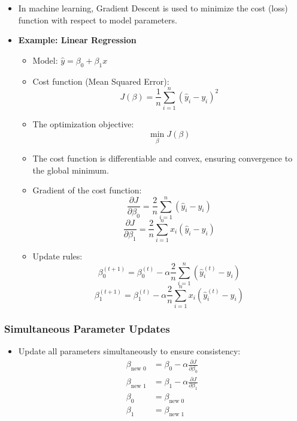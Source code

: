 \documentclass{article}
\begin{document}
\begin{itemize}
    \item In machine learning, Gradient Descent is used to minimize the cost (loss) function with respect to model parameters.
    \item \textbf{Example: Linear Regression}
    \begin{itemize}
        \item Model: $\hat{y} = \beta_0 + \beta_1 x$
        \item Cost function (Mean Squared Error):
        \[
        J(\beta) = \frac{1}{n} \sum_{i=1}^{n} (\hat{y}_i - y_i)^2
        \]
        \item The optimization objective:
        \[
        \min_{\beta} J(\beta)
        \]
        \item The cost function is differentiable and convex, ensuring convergence to the global minimum.
        \item Gradient of the cost function:
        \[
        \frac{\partial J}{\partial \beta_0} = \frac{2}{n} \sum_{i=1}^{n} (\hat{y}_i - y_i)
        \]
        \[
        \frac{\partial J}{\partial \beta_1} = \frac{2}{n} \sum_{i=1}^{n} x_i (\hat{y}_i - y_i)
        \]
        \item Update rules:
        \[
        \beta_0^{(t+1)} = \beta_0^{(t)} - \alpha \frac{2}{n} \sum_{i=1}^{n} (\hat{y}_i^{(t)} - y_i)
        \]
        \[
        \beta_1^{(t+1)} = \beta_1^{(t)} - \alpha \frac{2}{n} \sum_{i=1}^{n} x_i (\hat{y}_i^{(t)} - y_i)
        \]
    \end{itemize}
\end{itemize}

\subsubsection{Simultaneous Parameter Updates}

\begin{itemize}
    \item Update all parameters simultaneously to ensure consistency:
    \[
    \begin{aligned}
    \beta_{\text{new }0} &= \beta_0 - \alpha \frac{\partial J}{\partial \beta_0} \\
    \beta_{\text{new }1} &= \beta_1 - \alpha \frac{\partial J}{\partial \beta_1} \\
    \beta_0 &= \beta_{\text{new }0} \\
    \beta_1 &= \beta_{\text{new }1}
    \end{aligned}
    \]
\end{itemize}
\end{document}
